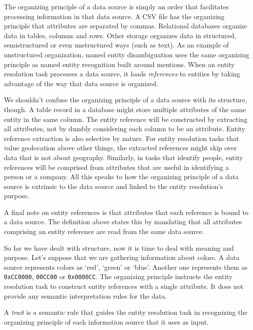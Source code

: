 \documentclass[journal]{IEEEtran}
\begin{document}
    The organizing principle of a data source is simply an order that
    facilitates processing information in that data source.
    A CSV file has the organizing principle that attributes are separated by
    commas.
    Relational databases organize data in tables, columns and rows.
    Other storage organizes data in structured, semistructured or even
    unstructured ways (such as text).
    As an example of unstructured organization, named entity disambiguation uses
    the same organizing principle as named entity recognition built around
    mentions.
    When an entity resolution task processes a data source, it loads
    \textit{references}\cite{Ben2009Swoosh} to entities by taking advantage of
    the way that data source is organized.

    We shouldn't confuse the organizing principle of a data source with its
    structure, though.
    A table record in a database might store multiple attributes of the same
    entity in the same column.
    The entity reference will be constructed by extracting all attributes, not
    by dumbly considering each column to be an attribute.
    Entity reference extraction is also selective by nature.
    For entity resolution tasks that value geolocation above other things, the
    extracted references might skip over data that is not about geography.
    Similarly, in tasks that identify people, entity references will be
    comprised from attributes that are useful in identifying a person or a
    company.
    All this speaks to how the organizing principle of a data source is
    extrinsic to the data source and linked to the entity resolution's purpose.

    A final note on entity references is that attributes that each reference is
    bound to a data source.
    The definition above states this by mandating that all attributes comprising
    an entity reference are read from the same data source.

    So far we have dealt with structure, now it is time to deal with meaning and
    purpose.    
    Let's suppose that we are gathering information about colors.
    A data source represents colors as `red', `green' or `blue'.
    Another one represents them as \texttt{0xCC0000}, \texttt{00CC00} or
    \texttt{0x0000CC}.
    The organizing principle instructs the entity resolution task to construct
    entity references with a single attribute.
    It does not provide any semantic interpretation rules for the data.
    
    \begin{defn}
        A \textit{trait} is a semantic rule that guides the entity resolution
        task in recognizing the organizing principle of each information source
        that it uses as input.
    \end{defn}
\end{document}
